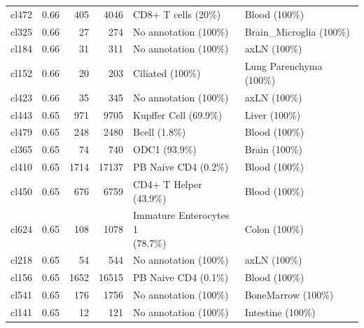 \begin{table}[ht!]
\begin{tabular}{lrrrll}
  cl472 & 0.66 & 405 & 4046 & CD8+ T cells (20\%) & Blood (100\%) \\ 
  cl325 & 0.66 &  27 & 274 & No annotation (100\%) & Brain\_Microglia (100\%) \\ 
  cl184 & 0.66 &  31 & 311 & No annotation (100\%) & axLN (100\%) \\ 
  cl152 & 0.66 &  20 & 203 & Ciliated (100\%) & Lung Parenchyma (100\%) \\ 
  cl423 & 0.66 &  35 & 345 & No annotation (100\%) & axLN (100\%) \\ 
  cl443 & 0.65 & 971 & 9705 & Kupffer Cell (69.9\%) & Liver (100\%) \\ 
  cl479 & 0.65 & 248 & 2480 & Bcell (1.8\%) & Blood (100\%) \\ 
  cl365 & 0.65 &  74 & 740 & ODC1 (93.9\%) & Brain (100\%) \\ 
  cl410 & 0.65 & 1714 & 17137 & PB Naive CD4  (0.2\%) & Blood (100\%) \\ 
  cl450 & 0.65 & 676 & 6759 & CD4+ T Helper (43.9\%) & Blood (100\%) \\ 
  cl624 & 0.65 & 108 & 1078 & \specialcell[t]{Immature Enterocytes 1\\(78.7\%)} & Colon (100\%) \\ 
  cl218 & 0.65 &  54 & 544 & No annotation (100\%) & axLN (100\%) \\ 
  cl156 & 0.65 & 1652 & 16515 & PB Naive CD4  (0.1\%) & Blood (100\%) \\ 
  cl541 & 0.65 & 176 & 1756 & No annotation (100\%) & BoneMarrow (100\%) \\ 
  cl141 & 0.65 &  12 & 121 & No annotation (100\%) & Intestine (100\%) \\ 
   \bottomrule
\end{tabular}
\end{table}  
  
